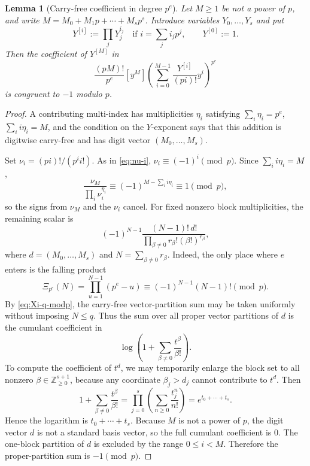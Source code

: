 \documentclass[11pt]{amsart}
\numberwithin{equation}{section}
\newtheorem{lemma}[lemma]{Lemma}
\begin{document}
\begin{lemma}[Carry-free coefficient in degree $p^e$]\label{lem:carry-free-coeff-pe}
Let $M\ge1$ be not a power of $p$, and write $M=M_0+M_1p+\cdots+M_sp^s$.  Introduce variables $Y_0,\ldots,Y_s$ and put
\[
        Y^{[i]}:=\prod_jY_j^{i_j}\quad\text{if }i=\sum_ji_jp^j,
        \qquad Y^{[0]}:=1.
\]
Then the coefficient of $Y^{[M]}$ in
\[
        \frac{(pM)!}{p^e}[y^M]
        \left(\sum_{i=0}^{M-1}\frac{Y^{[i]}}{(pi)!}y^i\right)^{p^e}
\]
is congruent to $-1$ modulo $p$.
\end{lemma}
\begin{proof}
A contributing multi-index has multiplicities $\eta_i$ satisfying $\sum_i\eta_i=p^e$, $\sum_i i\eta_i=M$, and the condition on the $Y$-exponent says that this addition is digitwise carry-free and has digit vector $(M_0,\ldots,M_s)$.

Set $\nu_i=(pi)!/(p^ii!)$.  As in \eqref{eq:nu-i}, $\nu_i\equiv (-1)^i\pmod p$.  Since $\sum_i i\eta_i=M$,
\[
        \frac{\nu_M}{\prod_i\nu_i^{\eta_i}}
        \equiv (-1)^{M-\sum_i i\eta_i}
        \equiv 1\pmod p,
\]
so the signs from $\nu_M$ and the $\nu_i$ cancel.  For fixed nonzero block multiplicities, the remaining scalar is
\[
        (-1)^{N-1}\frac{(N-1)!\,d!}{\prod_{\beta\ne0}r_\beta!(\beta!)^{r_\beta}},
\]
where $d=(M_0,\ldots,M_s)$ and $N=\sum_{\beta\ne0}r_\beta$.  Indeed, the only place where $e$ enters is the falling product
\[
        \Xi_{p^e}(N)=\prod_{u=1}^{N-1}(p^e-u)\equiv(-1)^{N-1}(N-1)!\pmod p.
\]
By \eqref{eq:Xi-q-modp}, the carry-free vector-partition sum may be taken uniformly without imposing $N\le q$.
Thus the sum over all proper vector partitions of $d$ is the cumulant coefficient in
\[
        \log\left(1+\sum_{\beta\ne0}\frac{t^\beta}{\beta!}\right).
\]
To compute the coefficient of $t^d$, we may temporarily enlarge the block set to all nonzero $\beta\in\mathbb Z_{\ge0}^{s+1}$, because any coordinate $\beta_j>d_j$ cannot contribute to $t^d$.  Then
\[
        1+\sum_{\beta\ne0}\frac{t^\beta}{\beta!}
        =\prod_{j=0}^s\left(\sum_{n\ge0}\frac{t_j^n}{n!}\right)
        =e^{t_0+\cdots+t_s}.
\]
Hence the logarithm is $t_0+\cdots+t_s$.  Because $M$ is not a power of $p$, the digit vector $d$ is not a standard basis vector, so the full cumulant coefficient is $0$.  The one-block partition of $d$ is excluded by the range $0\le i<M$.  Therefore the proper-partition sum is $-1\pmod p$.
\end{proof}
\end{document}
